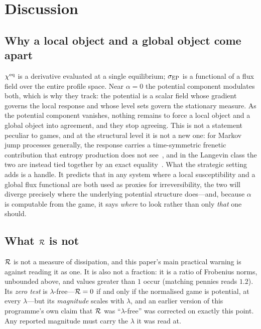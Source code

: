 \section{Discussion}
\label{sec:discussion}

\subsection{Why a local object and a global object come apart}
$\chi^{\mathrm{eq}}$ is a derivative evaluated at a single equilibrium; $\sigma_{\mathrm{EP}}$ is a functional of a flux
field over the entire profile space. Near $\alpha=0$ the potential component modulates both,
which is why they track: the potential is a scalar field whose gradient governs the local
response and whose level sets govern the stationary measure. As the potential component
vanishes, nothing remains to force a local object and a global object into agreement, and
they stop agreeing. This is not a statement peculiar to games, and at the structural level it
is not a new one: for Markov jump processes generally, the response carries a time-symmetric
frenetic contribution that entropy production does not see~\cite{baiesi2009}, and in the
Langevin class the two are instead tied together by an exact
equality~\cite{haradasasa2005}. What the strategic setting adds is a handle. It predicts
that in any system where a local susceptibility and a global flux functional are both used as
proxies for irreversibility, the two will diverge precisely where the underlying potential
structure does---and, because $\alpha$ is computable from the game, it says \emph{where} to
look rather than only \emph{that} one should.

\subsection{What \texorpdfstring{$\mathcal{R}$}{R} is not}
$\mathcal{R}$ is not a measure of dissipation, and this paper's main practical warning is against
reading it as one. It is also not a fraction: it is a ratio of Frobenius norms, unbounded
above, and values greater than $1$ occur (matching pennies reads $1.2$). Its \emph{zero
test} is $\lambda$-free---$\mathcal{R}=0$ if and only if the normalised game is potential, at every
$\lambda$---but its \emph{magnitude} scales with $\lambda$, and an earlier version of this
programme's own claim that $\mathcal{R}$ was ``$\lambda$-free'' was corrected on exactly this point.
Any reported magnitude must carry the $\lambda$ it was read at.

